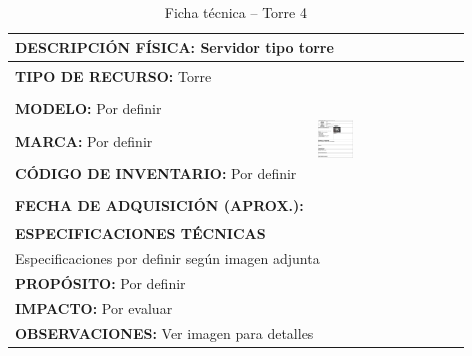 \begin{table}[H]
\centering
\caption{Ficha técnica -- Torre 4}
\label{tab:torre-4}
\begin{tabular}{|p{}|p{}|}
\hline
\multicolumn{2}{|l|}{\textbf{DESCRIPCIÓN FÍSICA:} Servidor tipo torre} \\ \hline
\textbf{TIPO DE RECURSO:} Torre & 
\multirow{5}{*}{\includegraphics[width=0.25\textwidth,height=4cm,keepaspectratio]{tablas-images/cp1/torres/torre-4.png}} \\ \cline{1-1}
\textbf{MODELO:} Por definir & \\ \cline{1-1}
\textbf{MARCA:} Por definir & \\ \cline{1-1}
\textbf{CÓDIGO DE INVENTARIO:} Por definir & \\ \cline{1-1}
\textbf{FECHA DE ADQUISICIÓN (APROX.):} & \\ \hline
\multicolumn{2}{|l|}{\textbf{ESPECIFICACIONES TÉCNICAS}} \\ \hline
\multicolumn{2}{|p{0.95\textwidth}|}{
\footnotesize
Especificaciones por definir según imagen adjunta
} \\ \hline
\multicolumn{2}{|l|}{\textbf{PROPÓSITO:} Por definir} \\ \hline
\multicolumn{2}{|l|}{\textbf{IMPACTO:} Por evaluar} \\ \hline
\multicolumn{2}{|l|}{\textbf{OBSERVACIONES:} Ver imagen para detalles} \\ \hline
\end{tabular}
\end{table}

